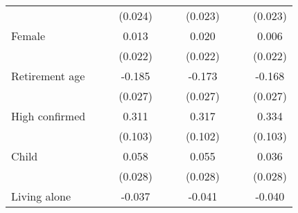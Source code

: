 {\begin{tabular}{l*{9}{c}}
                    &                     &                     &     (0.024)         &                     &                     &     (0.023)         &                     &                     &     (0.023)         \\
\addlinespace
Female              &                     &                     &       0.013         &                     &                     &       0.020         &                     &                     &       0.006         \\
                    &                     &                     &     (0.022)         &                     &                     &     (0.022)         &                     &                     &     (0.022)         \\
\addlinespace
Retirement age      &                     &                     &      -0.185\sym{***}&                     &                     &      -0.173\sym{***}&                     &                     &      -0.168\sym{***}\\
                    &                     &                     &     (0.027)         &                     &                     &     (0.027)         &                     &                     &     (0.027)         \\
\addlinespace
High confirmed      &                     &                     &       0.311\sym{***}&                     &                     &       0.317\sym{***}&                     &                     &       0.334\sym{***}\\
                    &                     &                     &     (0.103)         &                     &                     &     (0.102)         &                     &                     &     (0.103)         \\
\addlinespace
Child               &                     &                     &       0.058\sym{**} &                     &                     &       0.055\sym{*}  &                     &                     &       0.036         \\
                    &                     &                     &     (0.028)         &                     &                     &     (0.028)         &                     &                     &     (0.028)         \\
\addlinespace
Living alone        &                     &                     &      -0.037         &                     &                     &      -0.041         &                     &                     &      -0.040         \\

\end{tabular}}
